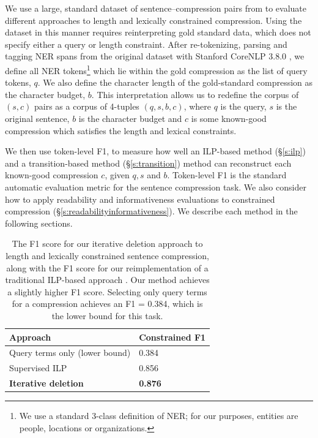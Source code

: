 \documentclass[11pt,a4paper]{article}
\begin{document}
We use a large, standard dataset of sentence--compression pairs from \citet{filippova2013overcoming} to evaluate different approaches to length and lexically constrained compression. Using the dataset in this manner requires reinterpreting gold standard data, which does not specify either a query or length constraint. After re-tokenizing, parsing and tagging NER spans from the original dataset with Stanford CoreNLP 3.8.0 \cite{corenlp}, we define all NER tokens\footnote{We use a standard 3-class definition of NER; for our purposes, entities are people, locations or organizations.} which lie within the gold compression as the list of query tokens, $q$. We also define the character length of the gold-standard compression as the character budget, $b$. This interpretation allows us to redefine the corpus of $(s,c)$ pairs as a corpus of 4-tuples $(q,s,b,c)$, where $q$ is the query, $s$ is the original sentence, $b$ is the character budget and $c$ is some known-good compression which satisfies the length and lexical constraints. 

We then use token-level F1, to measure how well an ILP-based method (\S\ref{s:ilp}) and a transition-based method (\S\ref{s:transition}) method can reconstruct each known-good compression $c$, given $q,s$ and $b$. Token-level F1 is the standard automatic evaluation metric for the sentence compression task. We also consider how to apply readability and informativeness evaluations to constrained compression (\S\ref{s:readabilityinformativeness}). We describe each method in the following sections.
    
\begin{table}[htb!]
\begin{tabular}{ll}
\centering
Approach & Constrained F1  \\ \hline
Query terms only (lower bound) & 0.384    \\
Supervised ILP  & 0.856          \\
 \textbf{Iterative deletion} &  \textbf{0.876}    \\
\end{tabular}
\caption{The F1 score for our iterative deletion approach to length and lexically constrained sentence compression, along with the F1 score for our reimplementation of a traditional ILP-based approach \cite{filippova2013overcoming}. Our method achieves a slightly higher F1 score. Selecting only query terms for a compression achieves an F1 = 0.384, which is the lower bound for this task.}
\end{table}
\end{document}
